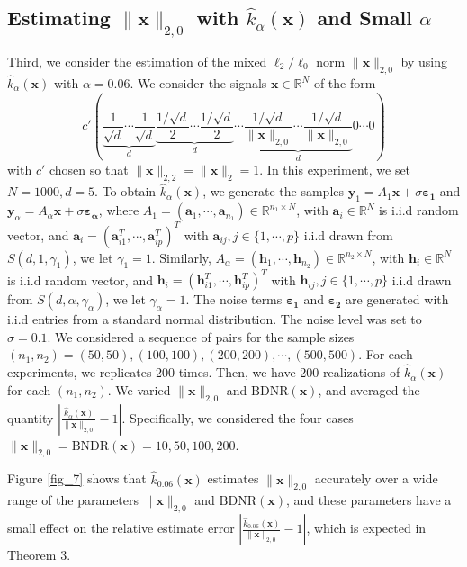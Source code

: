 \documentclass[journal,onecolumn]{IEEEtran}
\begin{document}
\subsection{Estimating $\lVert\mathbf{x}\rVert_{2,0}$ with $\hat{k}_{\alpha}(\mathbf{x})$ and Small $\alpha$}
Third, we consider the estimation of the mixed $\ell_2/\ell_0$ norm $\lVert\mathbf{x}\rVert_{2,0}$ by using $\hat{k}_{\alpha}(\mathbf{x})$ with $\alpha=0.06$. We consider the signals $\mathbf{x}\in\mathbb{R}^N$ of the form $$c'(\underbrace{\frac{1}{\sqrt{d}}\cdots\frac{1}{\sqrt{d}}}_{d}\underbrace{\frac{1/\sqrt{d}}{2}\cdots\frac{1/\sqrt{d}}{2}}_{d}\cdots
\underbrace{\frac{1/\sqrt{d}}{\lVert\mathbf{x}\rVert_{2,0}}\cdots\frac{1/\sqrt{d}}{\lVert\mathbf{x}\rVert_{2,0}}}_{d}0\cdots0)
$$
with $c'$ chosen so that $\lVert\mathbf{x}\rVert_{2,2}=\lVert\mathbf{x}\rVert_2=1$. In this experiment, we set $N=1000, d=5$. To obtain $\hat{k}_{\alpha}(\mathbf{x})$, we generate the samples $\mathbf{y}_1=A_1\mathbf{x}+\sigma\boldsymbol{\varepsilon_1}$ and $\mathbf{y}_{\alpha}=A_{\alpha}\mathbf{x}+\sigma\boldsymbol{\varepsilon_\alpha}$, where $A_1=(\mathbf{a}_1,\cdots,\mathbf{a}_{n_1})\in\mathbb{R}^{n_1\times N}$, with $\mathbf{a}_i\in\mathbb{R}^N$ is i.i.d random vector, and $\mathbf{a}_i=(\mathbf{a}_{i1}^T,\cdots,\mathbf{a}_{ip}^T)^T$ with $\mathbf{a}_{ij}, j\in\{1,\cdots,p\}$ i.i.d drawn from $S(d,1,\gamma_1)$, we let $\gamma_1=1$. Similarly,  $A_\alpha=(\mathbf{h}_1,\cdots,\mathbf{h}_{n_2})\in\mathbb{R}^{n_2\times N}$, with  $\mathbf{h}_i\in\mathbb{R}^N$ is i.i.d random vector, and $\mathbf{h}_i=(\mathbf{h}_{i1}^T,\cdots,\mathbf{h}_{ip}^T)^T$ with $\mathbf{h}_{ij}, j\in\{1,\cdots,p\}$ i.i.d drawn from $S(d,\alpha,\gamma_\alpha)$, we let $\gamma_\alpha=1$. The noise terms $\boldsymbol{\varepsilon_1}$ and $\boldsymbol{\varepsilon_2}$ are generated with i.i.d entries from a standard normal distribution. The noise level was set to $\sigma=0.1$. We considered a sequence of pairs for the sample sizes $(n_1,n_2)=(50,50),(100,100),(200,200),\cdots,(500,500)$. For each experiments, we replicates 200 times. Then, we have 200 realizations of $\hat{k}_\alpha(\mathbf{x})$ for each $(n_1,n_2)$. We varied $\lVert\mathbf{x}\rVert_{2,0}$ and  $\mathrm{BDNR}(\mathbf{x})$, and averaged the quantity $\left|\frac{\hat{k}_\alpha(\mathbf{x})}{\lVert\mathbf{x}\rVert_{2,0}}-1\right|$. Specifically, we considered the four cases $\lVert\mathbf{x}\rVert_{2,0}=\mathrm{BNDR}(\mathbf{x})=10,50,100,200$.

Figure \ref{fig_7} shows that $\hat{k}_{0.06}(\mathbf{x})$ estimates $\lVert\mathbf{x}\rVert_{2,0}$ accurately over a wide range of the parameters $\lVert\mathbf{x}\rVert_{2,0}$ and $\mathrm{BDNR}(\mathbf{x})$, and these parameters have a small effect on the relative estimate error $\left|\frac{\hat{k}_{0.06}(\mathbf{x})}{\lVert\mathbf{x}\rVert_{2,0}}-1\right|$, which is expected in Theorem 3.
\end{document}
